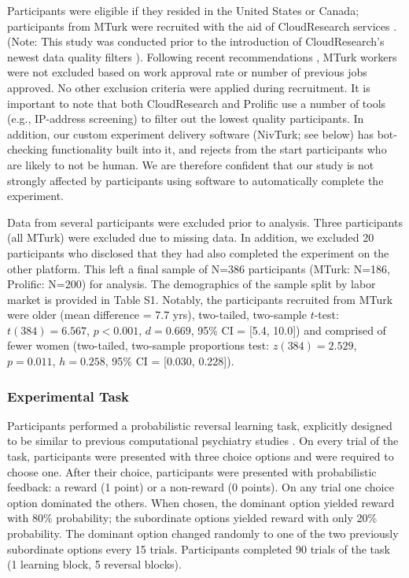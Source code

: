 \documentclass[a4paper,notitlepage,12pt]{article}
\begin{document}
Participants were eligible if they resided in the United States or Canada; participants from MTurk were recruited with the aid of CloudResearch services \cite{litman2017turkprime}. (Note: This study was conducted prior to the introduction of CloudResearch's newest data quality filters \cite{cloudresearch_2020}). Following recent recommendations \cite{robinson2019tapped}, MTurk workers were not excluded based on work approval rate or number of previous jobs approved. No other exclusion criteria were applied during recruitment. It is important to note that both CloudResearch and Prolific use a number of tools (e.g., IP-address screening) to filter out the lowest quality participants. In addition, our custom experiment delivery software (NivTurk; see below) has bot-checking functionality built into it, and rejects from the start participants who are likely to not be human. We are therefore confident that our study is not strongly affected by participants using software to automatically complete the experiment.

Data from several participants were excluded prior to analysis. Three participants (all MTurk) were excluded due to missing data. In addition, we excluded 20 participants who disclosed that they had also completed the experiment on the other platform. This left a final sample of N=386 participants (MTurk: N=186, Prolific: N=200) for analysis. The demographics of the sample split by labor market is provided in Table S1. Notably, the participants recruited from MTurk were older (mean difference = 7.7 yrs), two-tailed, two-sample $t$-test: $t(384)=6.567$, $p<0.001$, $d=0.669$, 95\% CI = [5.4, 10.0]) and comprised of fewer women (two-tailed, two-sample proportions test: $z(384)=2.529$, $p=0.011$, $h=0.258$, 95\% CI = [0.030, 0.228]). 

\subsubsection*{Experimental Task}

Participants performed a probabilistic reversal learning task, explicitly designed to be similar to previous computational psychiatry studies \cite{waltz2007probabilistic, mukherjee_reward_2020}. On every trial of the task, participants were presented with three choice options and were required to choose one. After their choice, participants were presented with probabilistic feedback: a reward (1 point) or a non-reward (0 points). On any trial one choice option dominated the others. When chosen, the dominant option yielded reward with 80\% probability; the subordinate options yielded reward with only 20\% probability. The dominant option changed randomly to one of the two previously subordinate options every 15 trials. Participants completed 90 trials of the task (1 learning block, 5 reversal blocks). 
\end{document}
